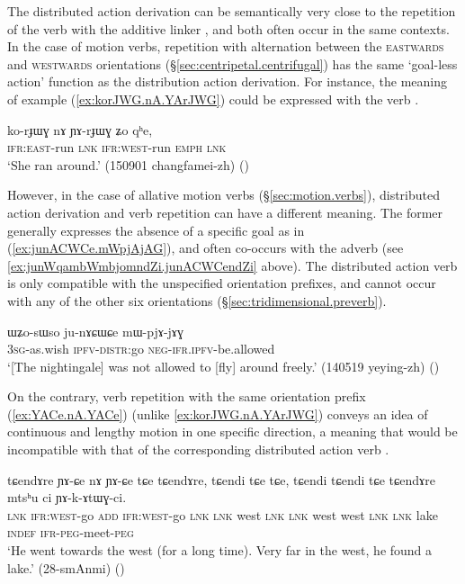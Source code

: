 The distributed action derivation can be semantically very close to the repetition of the verb with the additive linker , and both often occur in the same contexts. In the case of motion verbs, repetition with alternation between the \textsc{eastwards} and \textsc{westwards} orientations (§\ref{sec:centripetal.centrifugal}) has the same `goal-less action' function as the distribution action derivation. For instance, the meaning of example (\ref{ex:korJWG.nA.YArJWG}) could be expressed with the verb .

\begin{exe}
\ex \label{ex:korJWG.nA.YArJWG}
\gll ko-rɟɯɣ nɤ ɲɤ-rɟɯɣ ʑo qʰe, \\
\textsc{ifr}:\textsc{east}-run \textsc{lnk} \textsc{ifr}:\textsc{west}-run \textsc{emph} \textsc{lnk}  \\
\glt `She ran around.' (150901 changfamei-zh)
()
\end{exe}

However, in the case of allative motion verbs (§\ref{sec:motion.verbs}), distributed action derivation and verb repetition can have a different meaning. The former generally expresses the absence of a specific goal as in (\ref{ex:junACWCe.mWpjAjAG}), and often co-occurs with the adverb  (see \ref{ex:junWqambWmbjomndZi.junACWCendZi} above). The distributed action verb  is only compatible with the unspecified orientation prefixes, and cannot occur with any of the other six orientations (§\ref{sec:tridimensional.preverb}).

\begin{exe}
\ex \label{ex:junACWCe.mWpjAjAG}
\gll ɯʑo-sɯso ju-nɤɕɯɕe mɯ-pjɤ-jɤɣ \\
\textsc{3sg}-as.wish \textsc{ipfv}-\textsc{distr}:go \textsc{neg}-\textsc{ifr}.\textsc{ipfv}-be.allowed \\
\glt `[The nightingale] was not allowed to [fly] around freely.' (140519 yeying-zh) ()
\end{exe}


On the contrary, verb repetition with the same orientation prefix (\ref{ex:YACe.nA.YACe}) (unlike \ref{ex:korJWG.nA.YArJWG}) conveys an idea of continuous and lengthy motion in one specific direction, a meaning that would be incompatible with that of the corresponding distributed action verb .

\begin{exe}
\ex \label{ex:YACe.nA.YACe}
\gll tɕendɤre ɲɤ-ɕe nɤ ɲɤ-ɕe tɕe tɕendɤre, tɕendi tɕe tɕe, tɕendi tɕendi tɕe tɕendɤre mtsʰu ci ɲɤ-k-ɤtɯɣ-ci. \\
\textsc{lnk} \textsc{ifr}:\textsc{west}-go \textsc{add} \textsc{ifr}:\textsc{west}-go \textsc{lnk} \textsc{lnk} west \textsc{lnk} \textsc{lnk} west west \textsc{lnk} \textsc{lnk} lake \textsc{indef} \textsc{ifr}-\textsc{peg}-meet-\textsc{peg} \\
\glt `He went towards the west (for a long time). Very far in the west, he found a lake.' (28-smAnmi) ()
\end{exe}


